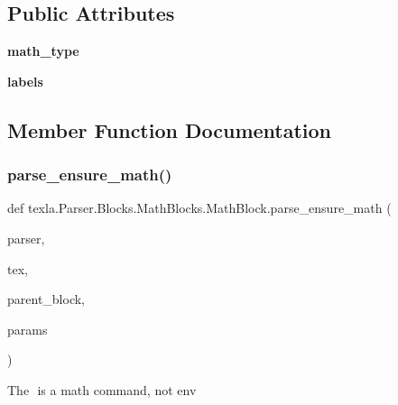 \subsection*{Public Attributes}
\begin{DoxyCompactItemize}
\item 
\hypertarget{classtexla_1_1Parser_1_1Blocks_1_1MathBlocks_1_1MathBlock_ab2667d65f7614809925dcd7252c6299b}{}\label{classtexla_1_1Parser_1_1Blocks_1_1MathBlocks_1_1MathBlock_ab2667d65f7614809925dcd7252c6299b} 
{\bfseries math\+\_\+type}
\item 
\hypertarget{classtexla_1_1Parser_1_1Blocks_1_1MathBlocks_1_1MathBlock_a112bfecb789c6797b2568c70e66abca0}{}\label{classtexla_1_1Parser_1_1Blocks_1_1MathBlocks_1_1MathBlock_a112bfecb789c6797b2568c70e66abca0} 
{\bfseries labels}
\end{DoxyCompactItemize}


\subsection{Member Function Documentation}
\hypertarget{classtexla_1_1Parser_1_1Blocks_1_1MathBlocks_1_1MathBlock_a1042d3f5eb3d461418397c8f02695dc6}{}\label{classtexla_1_1Parser_1_1Blocks_1_1MathBlocks_1_1MathBlock_a1042d3f5eb3d461418397c8f02695dc6} 
\subsubsection{\texorpdfstring{parse\+\_\+ensure\+\_\+math()}{parse\_ensure\_math()}}
{\footnotesize\ttfamily def texla.\+Parser.\+Blocks.\+Math\+Blocks.\+Math\+Block.\+parse\+\_\+ensure\+\_\+math (\begin{DoxyParamCaption}\item[{}]{parser,  }\item[{}]{tex,  }\item[{}]{parent\+\_\+block,  }\item[{}]{params }\end{DoxyParamCaption})\hspace{0.3cm}{\ttfamily [static]}}

\begin{DoxyVerb}The \ensuremath{} is a math command, not env\end{DoxyVerb}
 \hypertarget{classtexla_1_1Parser_1_1Blocks_1_1MathBlocks_1_1MathBlock_a0cfddf038e1062d9f24763dc604bebdb}{}\label{classtexla_1_1Parser_1_1Blocks_1_1MathBlocks_1_1MathBlock_a0cfddf038e1062d9f24763dc604bebdb} 
